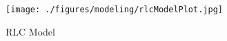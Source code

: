\begin{figure}[ht!]
\texttt{[image: ./figures/modeling/rlcModelPlot.jpg]}
\centering
\caption{RLC Model}
\label{fig:rlcModel}
\end{figure}
